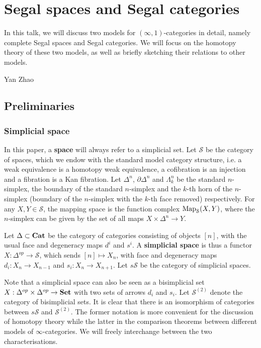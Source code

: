 \chapter{Segal spaces and Segal categories}

\begin{refsection}

In this talk, we will discuss two models for $(\infty,1)$-categories in detail, namely complete Segal spaces and Segal categories. We will focus on the homotopy theory of these two models, as well as briefly sketching their relations to other models.

\begin{flushright}
Yan Zhao
\end{flushright}

\section{Preliminaries}
\subsection{Simplicial space}
In this paper, a \textbf{space} will always refer to a simplicial set. Let $\mathcal S$ be the category of spaces, which we endow with the standard model category structure, i.e. a weak equivalence is a homotopy weak equivalence, a cofibration is an injection and a fibration is a Kan fibration. Let $\Delta^n$, $\partial\Delta^n$ and $\Lambda^n_k$ be the standard $n$-simplex, the boundary of the standard $n$-simplex and the $k$-th horn of the $n$-simplex (boundary of the $n$-simplex with the $k$-th face removed) respectively. For any $X,Y\in\mathcal{S}$, the mapping space is the function complex $\operatorname{\mathrm{Map}}_\mathcal S(X,Y)$, where the $n$-simplex can be given by the set of all maps $X\times\Delta^n\to Y$.

Let $\Delta\subset\mathbf{Cat}$ be the category of categories consisting of objects $[n]$, with the usual face and degeneracy maps $d^i$ and $s^i$. A \textbf{simplicial space} is thus a functor $X:\Delta^{op}\to\mathcal S$, which sends $[n]\mapsto X_n$, with face and degeneracy maps $d_i:X_n\to X_{n-1}$ and $s_i:X_n\to X_{n+1}$. Let $s\mathcal S$ be the category of simplicial spaces.

Note that a simplicial space can also be seen as a bisimplicial set $X:\Delta^{op}\times\Delta^{op}\to \mathbf{Set}$ with two sets of arrows $d_i$ and $s_i$. Let ${\mathcal S}^{(2)}$ denote the category of bisimplicial sets. It is clear that there is an isomorphism of categories between $s\mathcal S$ and ${\mathcal S}^{(2)}$. The former notation is more convenient for the discussion of homotopy theory while the latter in the comparison theorems between different models of $\infty$-categories. We will freely interchange between the two characterisations.


\end{refsection}
